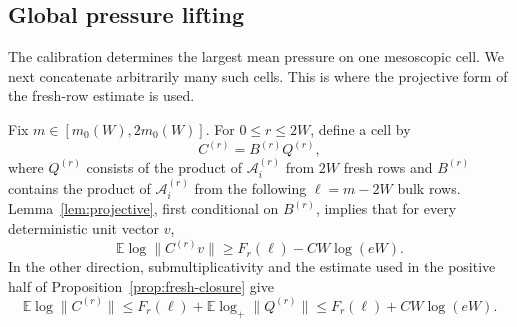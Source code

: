 \documentclass[11pt,reqno]{amsart}
\numberwithin{equation}{section}
\theoremstyle{definition}
\theoremstyle{remark}
\newcommand{\E}{\mathbb E}
\newcommand{\1}{\mathbf 1}
\begin{document}
\subsection{Global pressure lifting}
\label{sec:pressure-lifting}

The calibration determines the largest mean pressure on one mesoscopic
cell.  We next concatenate arbitrarily many such cells.  This is where the
projective form of the fresh-row estimate is used.

Fix \(m\in[m_0(W),2m_0(W)]\).  For \(0\leq r\leq2W\), define a cell by
\begin{equation}\label{eq:cell-transfer}
 C^{(r)}=B^{(r)}Q^{(r)},
\end{equation}
where $Q^{(r)}$ consists of the product of $\mathcal A_i^{(r)}$ from $2W$ fresh rows and $B^{(r)}$ contains the product of $\mathcal A_i^{(r)}$ from the following
$\ell=m-2W$ bulk rows.  Lemma~\ref{lem:projective}, first conditional on
$B^{(r)}$, implies that for every deterministic unit vector $v$,
\begin{equation}\label{eq:cell-lower}
 \E\log\|C^{(r)}v\|
 \ge F_r(\ell)-CW\log(eW).
\end{equation}
In the other direction, submultiplicativity and the estimate used in the
positive half of Proposition~\ref{prop:fresh-closure} give
\begin{equation}\label{eq:cell-upper}
 \E\log\|C^{(r)}\|
 \le F_r(\ell)+\E\log_+\|Q^{(r)}\|
 \le F_r(\ell)+CW\log(eW).
\end{equation}
\end{document}
